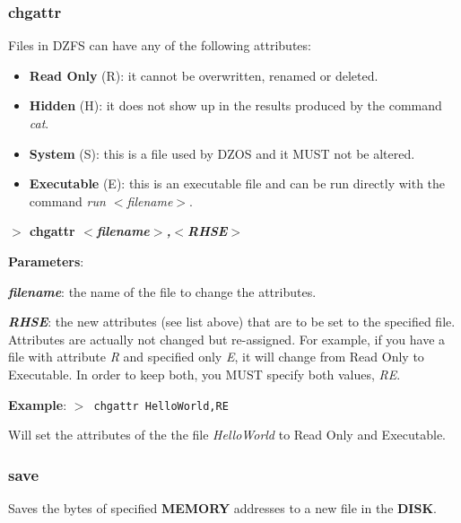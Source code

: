 \documentclass[a4paper,11pt]{article}
\begin{document}
        \subsubsection{{\color{blue}chgattr}}
        Files in DZFS can have any of the following attributes:
        
        \begin{itemize}
            \item \textbf{Read Only} (R): it cannot be overwritten, renamed or
            deleted.
            \item \textbf{Hidden} (H): it does not show up in the results
            produced by the command \textit{cat}.
            \item \textbf{System} (S): this is a file used by DZOS and it MUST
            not be altered.
            \item \textbf{Executable} (E): this is an executable file and can be
            run directly with the command \textit{run $<$filename$>$}.
        \end{itemize}

        \hspace{1.9cm}\textbf{$>$ chgattr \textit{$<$filename$>$,$<$RHSE$>$}}

        \textbf{Parameters}:

        \hspace{1cm}\textbf{\textit{filename}}: the name of the file to change
        the attributes.

        \hspace{1cm}\textbf{\textit{RHSE}}: the new attributes (see list above)
        that are to be set to the specified file. Attributes are actually not
        changed but re-assigned. For example, if you have a file with attribute
        \textit{R} and specified only \textit{E}, it will change from Read Only
        to Executable. In order to keep both, you MUST specify both values,
        \textit{RE}.
        
        \textbf{Example}: \texttt{$>$ chgattr HelloWorld,RE}

        Will set the attributes of the the file \textit{HelloWorld} to Read Only
        and Executable.

        \subsubsection{{\color{blue}save}}
        Saves the bytes of specified \textbf{MEMORY} addresses to a new file in
        the \textbf{DISK}.
\end{document}
